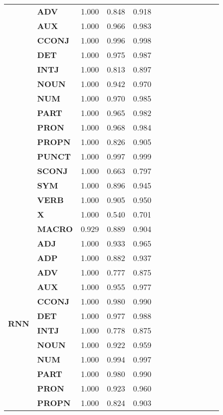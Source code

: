 \begin{longtable}{|l||l||l||l||l||l||l||l||l||l||l||l||l|}
\textbf{} & \textbf{ADV} & 1.000 & 0.848 & 0.918 \\
\textbf{} & \textbf{AUX} & 1.000 & 0.966 & 0.983 \\
\textbf{} & \textbf{CCONJ} & 1.000 & 0.996 & 0.998 \\
\textbf{} & \textbf{DET} & 1.000 & 0.975 & 0.987 \\
\textbf{} & \textbf{INTJ} & 1.000 & 0.813 & 0.897 \\
\textbf{} & \textbf{NOUN} & 1.000 & 0.942 & 0.970 \\
\textbf{} & \textbf{NUM} & 1.000 & 0.970 & 0.985 \\
\textbf{} & \textbf{PART} & 1.000 & 0.965 & 0.982 \\
\textbf{} & \textbf{PRON} & 1.000 & 0.968 & 0.984 \\
\textbf{} & \textbf{PROPN} & 1.000 & 0.826 & 0.905 \\
\textbf{} & \textbf{PUNCT} & 1.000 & 0.997 & 0.999 \\
\textbf{} & \textbf{SCONJ} & 1.000 & 0.663 & 0.797 \\
\textbf{} & \textbf{SYM} & 1.000 & 0.896 & 0.945 \\
\textbf{} & \textbf{VERB} & 1.000 & 0.905 & 0.950 \\
\textbf{} & \textbf{X} & 1.000 & 0.540 & 0.701 \\
\textbf{} & \textbf{MACRO} & 0.929 & 0.889 & 0.904 \\
\cline{1-5}
\multirow[t]{18}{*}{\textbf{RNN}} & \textbf{ADJ} & 1.000 & 0.933 & 0.965 \\
\textbf{} & \textbf{ADP} & 1.000 & 0.882 & 0.937 \\
\textbf{} & \textbf{ADV} & 1.000 & 0.777 & 0.875 \\
\textbf{} & \textbf{AUX} & 1.000 & 0.955 & 0.977 \\
\textbf{} & \textbf{CCONJ} & 1.000 & 0.980 & 0.990 \\
\textbf{} & \textbf{DET} & 1.000 & 0.977 & 0.988 \\
\textbf{} & \textbf{INTJ} & 1.000 & 0.778 & 0.875 \\
\textbf{} & \textbf{NOUN} & 1.000 & 0.922 & 0.959 \\
\textbf{} & \textbf{NUM} & 1.000 & 0.994 & 0.997 \\
\textbf{} & \textbf{PART} & 1.000 & 0.980 & 0.990 \\
\textbf{} & \textbf{PRON} & 1.000 & 0.923 & 0.960 \\
\textbf{} & \textbf{PROPN} & 1.000 & 0.824 & 0.903 \\

\end{longtable}

